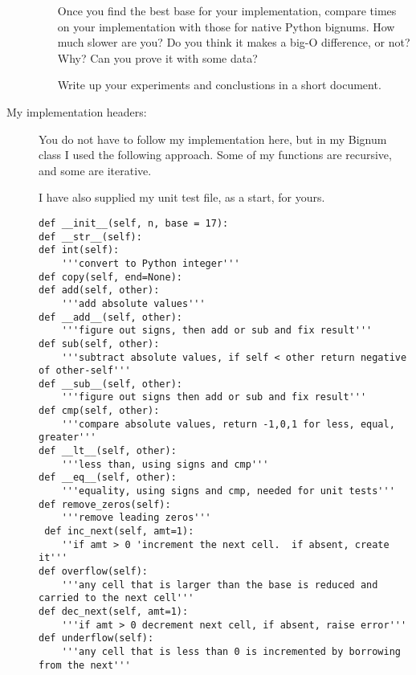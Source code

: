 \documentclass{article}
\begin{document}
\begin{description}
\begin{itemize}
Once you find the best base for your implementation, compare
times on your implementation with those for native Python bignums.
How much slower are you?  Do you think it makes a big-O difference,
or not?  Why?  Can you prove it with some data?

Write up your experiments and conclustions in a short document.

    
\end{itemize}

\newpage
\item[My implementation headers:]   
You do not have to follow my implementation here, 
but in my Bignum class 
I used the following approach.  Some of my functions are recursive,
and some are iterative.

I have also supplied my unit test file, as a start, for yours.

\begin{lstlisting}
def __init__(self, n, base = 17):
def __str__(self):
def int(self):
    '''convert to Python integer'''
def copy(self, end=None):
def add(self, other):
    '''add absolute values'''
def __add__(self, other):
    '''figure out signs, then add or sub and fix result'''
def sub(self, other):
    '''subtract absolute values, if self < other return negative of other-self'''
def __sub__(self, other):
    '''figure out signs then add or sub and fix result'''
def cmp(self, other):
    '''compare absolute values, return -1,0,1 for less, equal, greater'''        
def __lt__(self, other):
    '''less than, using signs and cmp'''
def __eq__(self, other):
    '''equality, using signs and cmp, needed for unit tests'''
def remove_zeros(self):
    '''remove leading zeros'''               
 def inc_next(self, amt=1):
    ''if amt > 0 'increment the next cell.  if absent, create it'''
def overflow(self):
    '''any cell that is larger than the base is reduced and carried to the next cell''' 
def dec_next(self, amt=1):
    '''if amt > 0 decrement next cell, if absent, raise error'''            
def underflow(self):
    '''any cell that is less than 0 is incremented by borrowing from the next'''
\end{lstlisting}
\end{description}
\end{document}
